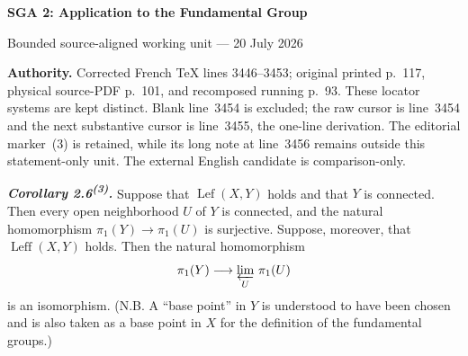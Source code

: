 \documentclass[10pt,a4paper]{article}
\newcommand{\Lefc}{\operatorname{Lef}}
\newcommand{\Leffc}{\operatorname{Leff}}
\begin{document}
\begin{center}
  {\Large\bfseries SGA 2: Application to the Fundamental Group}\par\smallskip
  {\large Bounded source-aligned working unit --- 20 July 2026}
\end{center}

\noindent\colorbox{softgray}{\parbox{0.95\linewidth}{\footnotesize\textbf{Authority.}
Corrected French TeX lines 3446--3453; original printed p.~117, physical
source-PDF p.~101, and recomposed running p.~93. These locator systems are
kept distinct. Blank line~3454 is excluded; the raw cursor is line~3454 and
the next substantive cursor is line~3455, the one-line derivation. The
editorial marker~(3) is retained, while its long note at line~3456 remains
outside this statement-only unit. The external English candidate is
comparison-only.}}

\medskip
\noindent\textbf{\textit{Corollary 2.6\textsuperscript{(3)}.}}
Suppose that $\Lefc(X,Y)$ holds and that $Y$ is connected. Then every open
neighborhood $U$ of $Y$ is connected, and the natural homomorphism
$\pi_1(Y)\longrightarrow\pi_1(U)$ is surjective. Suppose, moreover, that
$\Leffc(X,Y)$ holds. Then the natural homomorphism
\[
  \pi_1(Y)\longrightarrow\varprojlim_{U}\,\pi_1(U)
\]
is an isomorphism. (N.B. A ``base point'' in $Y$ is understood to have been
chosen and is also taken as a base point in $X$ for the definition of the
fundamental groups.)
\end{document}
